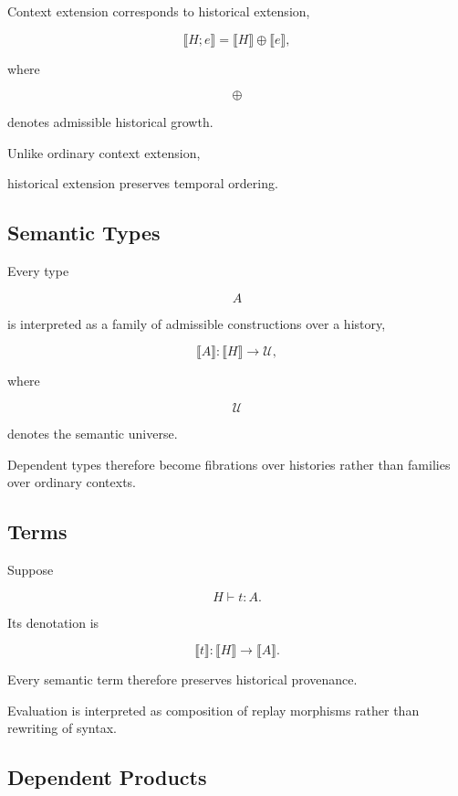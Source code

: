\documentclass[12pt,oneside]{article}
\theoremstyle{definition}
\theoremstyle{remark}
\begin{document}
Context extension corresponds to historical extension,

\[
\llbracket
H;e
\rrbracket
=
\llbracket H\rrbracket
\oplus
\llbracket e\rrbracket,
\]

where

\[
\oplus
\]

denotes admissible historical growth.

Unlike ordinary context extension,

historical extension preserves temporal ordering.


\subsection{Semantic Types}

Every type

\[
A
\]

is interpreted as a family of admissible constructions over a history,

\[
\llbracket
A
\rrbracket
:
\llbracket H\rrbracket
\rightarrow
\mathcal U,
\]

where

\[
\mathcal U
\]

denotes the semantic universe.

Dependent types therefore become fibrations over histories rather than families
over ordinary contexts.


\subsection{Terms}

Suppose

\[
H
\vdash
t
:
A.
\]

Its denotation is

\[
\llbracket
t
\rrbracket
:
\llbracket
H
\rrbracket
\rightarrow
\llbracket
A
\rrbracket.
\]

Every semantic term therefore preserves historical provenance.

Evaluation is interpreted as composition of replay morphisms rather than
rewriting of syntax.


\subsection{Dependent Products}
\end{document}
